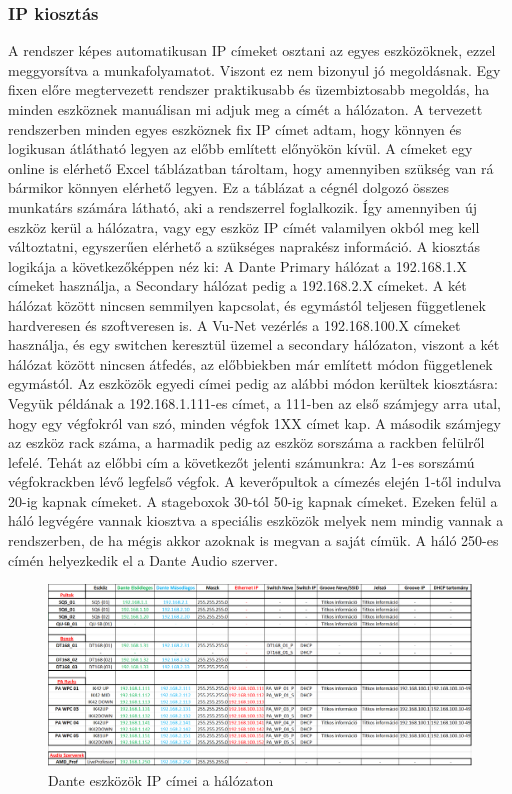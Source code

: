 \subsubsection{IP kiosztás}
A rendszer képes automatikusan IP címeket osztani az egyes eszközöknek,
ezzel meggyorsítva a munkafolyamatot. Viszont ez nem bizonyul jó megoldásnak.
Egy fixen előre megtervezett rendszer praktikusabb és
üzembiztosabb megoldás, ha minden eszköznek manuálisan mi adjuk meg a címét a
hálózaton. A tervezett rendszerben minden egyes eszköznek fix IP címet adtam,
hogy könnyen és logikusan átlátható legyen az előbb említett előnyökön kívül.
A címeket egy online is elérhető Excel táblázatban tároltam, hogy amennyiben szükség van rá
bármikor könnyen elérhető legyen. Ez a táblázat a cégnél dolgozó összes munkatárs számára látható,
aki a rendszerrel foglalkozik. Így amennyiben új eszköz kerül a hálózatra, vagy egy eszköz IP címét
valamilyen okból meg kell változtatni, egyszerűen elérhető a szükséges naprakész információ.
A kiosztás logikája a következőképpen néz ki:
A Dante Primary hálózat a 192.168.1.X címeket használja, a Secondary hálózat
pedig a 192.168.2.X címeket. A két hálózat között nincsen semmilyen kapcsolat, és egymástól teljesen függetlenek hardveresen és szoftveresen is.
A Vu-Net vezérlés a 192.168.100.X címeket használja, és egy switchen keresztül üzemel a secondary hálózaton, viszont a két hálózat között nincsen
átfedés, az előbbiekben már említett módon függetlenek egymástól.
Az eszközök egyedi címei pedig az alábbi módon kerültek kiosztásra:
Vegyük példának a 192.168.1.111-es címet, a 111-ben az első számjegy arra utal, hogy egy végfokról van szó, minden végfok
1XX címet kap. A második számjegy az eszköz rack száma, a harmadik pedig az eszköz sorszáma a rackben felülről lefelé.
Tehát az előbbi cím a következőt jelenti számunkra: Az 1-es sorszámú végfokrackben lévő legfelső végfok.
A keverőpultok a címezés elején 1-től indulva 20-ig kapnak címeket. A stageboxok 30-tól 50-ig kapnak címeket.
Ezeken felül a háló legvégére vannak kiosztva a speciális eszközök melyek nem mindig vannak a rendszerben, de ha mégis
akkor azoknak is megvan a saját címük.
A háló 250-es címén helyezkedik el a Dante Audio szerver.
\begin{figure}[H]
	\centering
	\includegraphics[width=\textwidth, keepaspectratio]{figures/dante_ips.png}
	\caption{Dante eszközök IP címei a hálózaton}\label{fig:dante_ips}
\end{figure}
